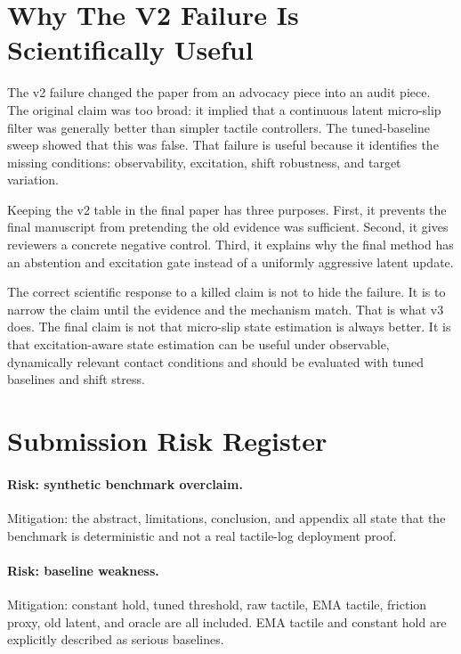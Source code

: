 \documentclass{article}
\begin{document}
\section{Why The V2 Failure Is Scientifically Useful}

The v2 failure changed the paper from an advocacy piece into an audit piece. The original claim was too broad: it implied that a continuous latent micro-slip filter was generally better than simpler tactile controllers. The tuned-baseline sweep showed that this was false. That failure is useful because it identifies the missing conditions: observability, excitation, shift robustness, and target variation.

Keeping the v2 table in the final paper has three purposes. First, it prevents the final manuscript from pretending the old evidence was sufficient. Second, it gives reviewers a concrete negative control. Third, it explains why the final method has an abstention and excitation gate instead of a uniformly aggressive latent update.

The correct scientific response to a killed claim is not to hide the failure. It is to narrow the claim until the evidence and the mechanism match. That is what v3 does. The final claim is not that micro-slip state estimation is always better. It is that excitation-aware state estimation can be useful under observable, dynamically relevant contact conditions and should be evaluated with tuned baselines and shift stress.

\section{Submission Risk Register}

\paragraph{Risk: synthetic benchmark overclaim.}
Mitigation: the abstract, limitations, conclusion, and appendix all state that the benchmark is deterministic and not a real tactile-log deployment proof.

\paragraph{Risk: baseline weakness.}
Mitigation: constant hold, tuned threshold, raw tactile, EMA tactile, friction proxy, old latent, and oracle are all included. EMA tactile and constant hold are explicitly described as serious baselines.
\end{document}
